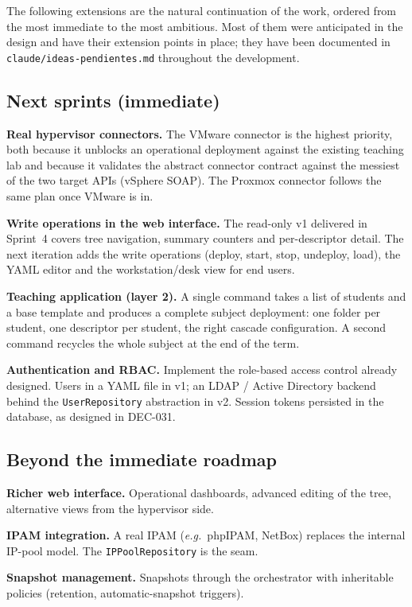 The following extensions are the natural continuation of the work,
ordered from the most immediate to the most ambitious. Most of them
were anticipated in the design and have their extension points in
place; they have been documented in
\texttt{claude/ideas-pendientes.md} throughout the development.

\subsection{Next sprints (immediate)}

\textbf{Real hypervisor connectors.} The VMware connector is the
highest priority, both because it unblocks an operational deployment
against the existing teaching lab and because it validates the
abstract connector contract against the messiest of the two target
APIs (vSphere SOAP). The Proxmox connector follows the same plan
once VMware is in.

\textbf{Write operations in the web interface.} The read-only
v1 delivered in Sprint~4 covers tree navigation, summary counters
and per-descriptor detail. The next iteration adds the write
operations (deploy, start, stop, undeploy, load), the YAML editor
and the workstation/desk view for end users.

\textbf{Teaching application (layer 2).} A single command takes a
list of students and a base template and produces a complete
subject deployment: one folder per student, one descriptor per
student, the right cascade configuration. A second command recycles
the whole subject at the end of the term.

\textbf{Authentication and RBAC.} Implement the role-based access
control already designed. Users in a YAML file in v1; an LDAP /
Active Directory backend behind the \texttt{UserRepository}
abstraction in v2. Session tokens persisted in the database, as
designed in DEC-031.

\subsection{Beyond the immediate roadmap}

\textbf{Richer web interface.} Operational dashboards, advanced
editing of the tree, alternative views from the hypervisor side.

\textbf{IPAM integration.} A real IPAM (\emph{e.g.}\ phpIPAM,
NetBox) replaces the internal IP-pool model. The
\texttt{IPPoolRepository} is the seam.

\textbf{Snapshot management.} Snapshots through the orchestrator
with inheritable policies (retention, automatic-snapshot triggers).

